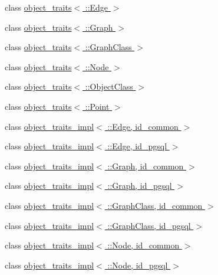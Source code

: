\begin{DoxyCompactItemize}
\item 
class \hyperlink{classodb_1_1access_1_1object__traits_3_01_1_1_edge_01_4}{object\+\_\+traits$<$ \+::\+Edge $>$}
\item 
class \hyperlink{classodb_1_1access_1_1object__traits_3_01_1_1_graph_01_4}{object\+\_\+traits$<$ \+::\+Graph $>$}
\item 
class \hyperlink{classodb_1_1access_1_1object__traits_3_01_1_1_graph_class_01_4}{object\+\_\+traits$<$ \+::\+Graph\+Class $>$}
\item 
class \hyperlink{classodb_1_1access_1_1object__traits_3_01_1_1_node_01_4}{object\+\_\+traits$<$ \+::\+Node $>$}
\item 
class \hyperlink{classodb_1_1access_1_1object__traits_3_01_1_1_object_class_01_4}{object\+\_\+traits$<$ \+::\+Object\+Class $>$}
\item 
class \hyperlink{classodb_1_1access_1_1object__traits_3_01_1_1_point_01_4}{object\+\_\+traits$<$ \+::\+Point $>$}
\item 
class \hyperlink{classodb_1_1access_1_1object__traits__impl_3_01_1_1_edge_00_01id__common_01_4}{object\+\_\+traits\+\_\+impl$<$ \+::\+Edge, id\+\_\+common $>$}
\item 
class \hyperlink{classodb_1_1access_1_1object__traits__impl_3_01_1_1_edge_00_01id__pgsql_01_4}{object\+\_\+traits\+\_\+impl$<$ \+::\+Edge, id\+\_\+pgsql $>$}
\item 
class \hyperlink{classodb_1_1access_1_1object__traits__impl_3_01_1_1_graph_00_01id__common_01_4}{object\+\_\+traits\+\_\+impl$<$ \+::\+Graph, id\+\_\+common $>$}
\item 
class \hyperlink{classodb_1_1access_1_1object__traits__impl_3_01_1_1_graph_00_01id__pgsql_01_4}{object\+\_\+traits\+\_\+impl$<$ \+::\+Graph, id\+\_\+pgsql $>$}
\item 
class \hyperlink{classodb_1_1access_1_1object__traits__impl_3_01_1_1_graph_class_00_01id__common_01_4}{object\+\_\+traits\+\_\+impl$<$ \+::\+Graph\+Class, id\+\_\+common $>$}
\item 
class \hyperlink{classodb_1_1access_1_1object__traits__impl_3_01_1_1_graph_class_00_01id__pgsql_01_4}{object\+\_\+traits\+\_\+impl$<$ \+::\+Graph\+Class, id\+\_\+pgsql $>$}
\item 
class \hyperlink{classodb_1_1access_1_1object__traits__impl_3_01_1_1_node_00_01id__common_01_4}{object\+\_\+traits\+\_\+impl$<$ \+::\+Node, id\+\_\+common $>$}
\item 
class \hyperlink{classodb_1_1access_1_1object__traits__impl_3_01_1_1_node_00_01id__pgsql_01_4}{object\+\_\+traits\+\_\+impl$<$ \+::\+Node, id\+\_\+pgsql $>$}

\end{DoxyCompactItemize}
